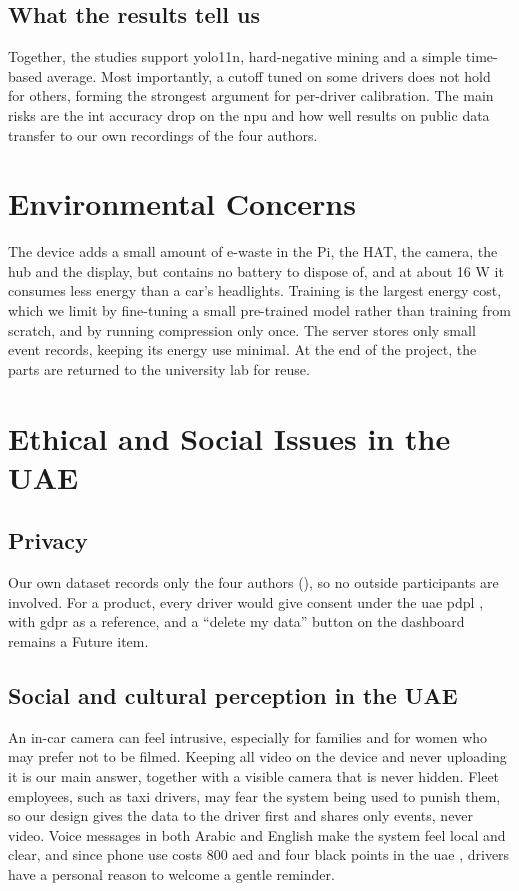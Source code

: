 \subsection{What the results tell us}

Together, the studies support \gls{yolo}11n, hard-negative mining and a simple time-based average. Most importantly, a cutoff tuned on some drivers does not hold for others, forming the strongest argument for per-driver calibration. The main risks are the \gls{int} accuracy drop on the \gls{npu} and how well results on public data transfer to our own recordings of the four authors.


\section{Environmental Concerns}

The device adds a small amount of e-waste in the Pi, the HAT, the camera, the hub and the display, but contains no battery to dispose of, and at about 16 W it consumes less energy than a car's headlights. Training is the largest energy cost, which we limit by fine-tuning a small pre-trained model rather than training from scratch, and by running compression only once. The server stores only small event records, keeping its energy use minimal. At the end of the project, the parts are returned to the university lab for reuse.

\section{Ethical and Social Issues in the UAE}
\label{sec:ethics}
\subsection{Privacy}

Our own dataset records only the four authors (), so no outside participants are involved. For a product, every driver would give consent under the \gls{uae} \gls{pdpl} \cite{r56}, with \gls{gdpr} \cite{r57} as a reference, and a ``delete my data'' button on the dashboard remains a Future item.

\subsection{Social and cultural perception in the UAE}

An in-car camera can feel intrusive, especially for families and for women who may prefer not to be filmed. Keeping all video on the device and never uploading it is our main answer, together with a visible camera that is never hidden. Fleet employees, such as taxi drivers, may fear the system being used to punish them, so our design gives the data to the driver first and shares only events, never video. Voice messages in both Arabic and English make the system feel local and clear, and since phone use costs 800 \gls{aed} and four black points in the \gls{uae} \cite{r65}, drivers have a personal reason to welcome a gentle reminder.

